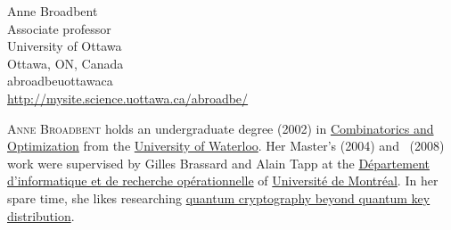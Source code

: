 \documentclass{toc}
\begin{document}
%
%
%



%
%
%
%




%
%
%
%
\begin{tocauthors}
\begin{tocinfo}[broadbent]
 Anne Broadbent\\
%
Associate professor\\
 University of Ottawa\\
 Ottawa, ON, Canada\\
 abroadbe\tocat{}uottawa\tocdot{}ca \\
 \url{http://mysite.science.uottawa.ca/abroadbe/}
\end{tocinfo}
\end{tocauthors}

%
%
%
%
%
%
%
%
%
%
%
%
%
%
\begin{tocaboutauthors}
\begin{tocabout}[broadbent]
\textsc{Anne Broadbent} holds an undergraduate degree  (2002) in
\href{https://uwaterloo.ca/combinatorics-and-optimization/}{Combinatorics and Optimization} from the
\href{https://uwaterloo.ca/}{University of Waterloo}.
Her Master's (2004) and \phd\ (2008) work were supervised by Gilles Brassard and Alain Tapp at the
\href{http://diro.umontreal.ca/}{D\'epartement d'informatique et de recherche op\'erationnelle} of
\href{http://www.umontreal.ca/}{Universit\'e de Montr\'eal}.
In her spare time, she likes researching
\href{https://doi.org/10.1007/s10623-015-0157-4}{quantum cryptography beyond quantum key distribution}.
\end{tocabout}
\end{tocaboutauthors}
\end{document}
